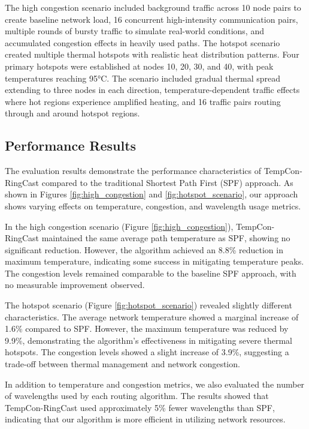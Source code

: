 \documentclass[conference]{IEEEtran}
\begin{document}
The high congestion scenario included background traffic across 10 node pairs to create baseline network load, 16 concurrent high-intensity communication pairs, multiple rounds of bursty traffic to simulate real-world conditions, and accumulated congestion effects in heavily used paths. The hotspot scenario created multiple thermal hotspots with realistic heat distribution patterns. Four primary hotspots were established at nodes 10, 20, 30, and 40, with peak temperatures reaching 95°C. The scenario included gradual thermal spread extending to three nodes in each direction, temperature-dependent traffic effects where hot regions experience amplified heating, and 16 traffic pairs routing through and around hotspot regions.

\subsection{Performance Results}
The evaluation results demonstrate the performance characteristics of TempCon-RingCast compared to the traditional Shortest Path First (SPF) approach. As shown in Figures \ref{fig:high_congestion} and \ref{fig:hotspot_scenario}, our approach shows varying effects on temperature, congestion, and wavelength usage metrics.

In the high congestion scenario (Figure \ref{fig:high_congestion}), TempCon-RingCast maintained the same average path temperature as SPF, showing no significant reduction. However, the algorithm achieved an 8.8\% reduction in maximum temperature, indicating some success in mitigating temperature peaks. The congestion levels remained comparable to the baseline SPF approach, with no measurable improvement observed.

The hotspot scenario (Figure \ref{fig:hotspot_scenario}) revealed slightly different characteristics. The average network temperature showed a marginal increase of 1.6\% compared to SPF. However, the maximum temperature was reduced by 9.9\%, demonstrating the algorithm's effectiveness in mitigating severe thermal hotspots. The congestion levels showed a slight increase of 3.9\%, suggesting a trade-off between thermal management and network congestion.

In addition to temperature and congestion metrics, we also evaluated the number of wavelengths used by each routing algorithm. The results showed that TempCon-RingCast used approximately 5\% fewer wavelengths than SPF, indicating that our algorithm is more efficient in utilizing network resources.
\end{document}
